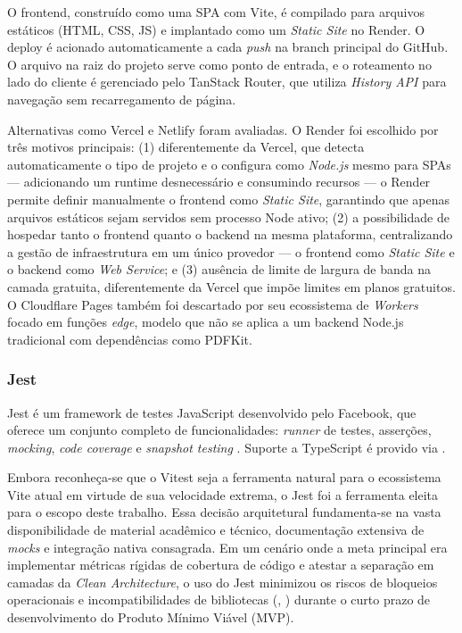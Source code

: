 O frontend, construído como uma SPA com Vite, é compilado para arquivos estáticos (HTML, CSS, JS) e implantado como um \textit{Static Site} no Render. O deploy é acionado automaticamente a cada \textit{push} na branch principal do GitHub. O arquivo  na raiz do projeto serve como ponto de entrada, e o roteamento no lado do cliente é gerenciado pelo TanStack Router, que utiliza \textit{History API} para navegação sem recarregamento de página.

Alternativas como Vercel e Netlify foram avaliadas. O Render foi escolhido por três motivos principais: (1) diferentemente da Vercel, que detecta automaticamente o tipo de projeto e o configura como \textit{Node.js} mesmo para SPAs --- adicionando um runtime desnecessário e consumindo recursos --- o Render permite definir manualmente o frontend como \textit{Static Site}, garantindo que apenas arquivos estáticos sejam servidos sem processo Node ativo; (2) a possibilidade de hospedar tanto o frontend quanto o backend na mesma plataforma, centralizando a gestão de infraestrutura em um único provedor --- o frontend como \textit{Static Site} e o backend como \textit{Web Service}; e (3) ausência de limite de largura de banda na camada gratuita, diferentemente da Vercel que impõe limites em planos gratuitos. O Cloudflare Pages também foi descartado por seu ecossistema de \textit{Workers} focado em funções \textit{edge}, modelo que não se aplica a um backend Node.js tradicional com dependências como PDFKit.

\subsubsection{Jest}
Jest é um framework de testes JavaScript desenvolvido pelo Facebook, que oferece um conjunto completo de funcionalidades: \textit{runner} de testes, asserções, \textit{mocking}, \textit{code coverage} e \textit{snapshot testing} \cite{jest2025}. Suporte a TypeScript é provido via .

Embora reconheça-se que o Vitest seja a ferramenta natural para o ecossistema Vite atual em virtude de sua velocidade extrema, o Jest foi a ferramenta eleita para o escopo deste trabalho. Essa decisão arquitetural fundamenta-se na vasta disponibilidade de material acadêmico e técnico, documentação extensiva de \textit{mocks} e integração nativa consagrada. Em um cenário onde a meta principal era implementar métricas rígidas de cobertura de código e atestar a separação em camadas da \textit{Clean Architecture}, o uso do Jest minimizou os riscos de bloqueios operacionais e incompatibilidades de bibliotecas (, ) durante o curto prazo de desenvolvimento do Produto Mínimo Viável (MVP).

